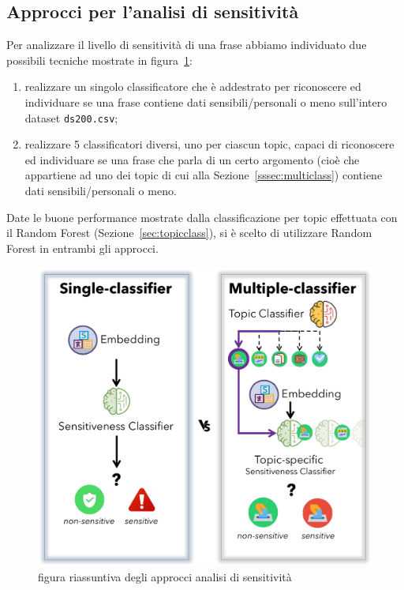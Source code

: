 \subsection{Approcci per l'analisi di sensitività}
\label{ssec:approcci}
Per analizzare il livello di sensitività di una frase abbiamo individuato due possibili tecniche mostrate in figura~\ref{fig:approccisens}:
\begin{enumerate}
    \item realizzare un singolo classificatore che è addestrato per riconoscere ed individuare se una frase contiene dati sensibili/personali o meno sull'intero dataset {\tt ds200.csv};
    \item realizzare 5 classificatori diversi, uno per ciascun topic, capaci di riconoscere ed individuare se una frase che parla di un certo argomento (cioè che appartiene ad uno dei topic di cui alla Sezione~\ref{sssec:multiclass}) contiene dati sensibili/personali o meno.
\end{enumerate}
Date le buone performance mostrate dalla classificazione per topic effettuata con il Random Forest (Sezione~\ref{sec:topicclass}), si è scelto di utilizzare Random Forest in entrambi gli approcci.

\begin{figure}[h]
    \centering
    \includegraphics[width=15cm]{Figure/grafici/vs_cropped.pdf}
    \caption{figura riassuntiva degli approcci analisi di sensitività}
    \label{fig:approccisens}
\end{figure}
\FloatBarrier



